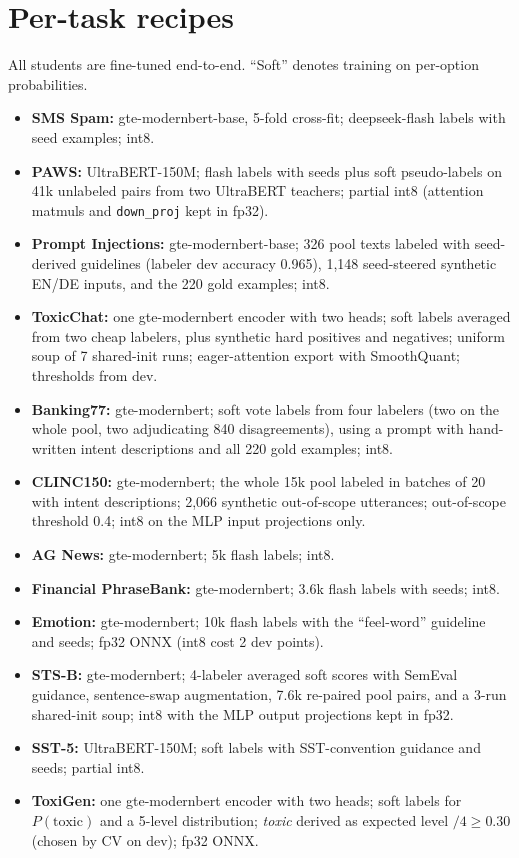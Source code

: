 \documentclass[11pt]{article}
\begin{document}
\section{Per-task recipes}\label{app:recipes}
All students are fine-tuned end-to-end. ``Soft'' denotes training on per-option probabilities.
\begin{itemize}
  \item \textbf{SMS Spam:} gte-modernbert-base, 5-fold cross-fit; deepseek-flash labels with seed examples; int8.
  \item \textbf{PAWS:} UltraBERT-150M; flash labels with seeds plus soft pseudo-labels on 41k unlabeled pairs from two UltraBERT teachers; partial int8 (attention matmuls and \texttt{down\_proj} kept in fp32).
  \item \textbf{Prompt Injections:} gte-modernbert-base; 326 pool texts labeled with seed-derived guidelines (labeler dev accuracy 0.965), 1,148 seed-steered synthetic EN/DE inputs, and the 220 gold examples; int8.
  \item \textbf{ToxicChat:} one gte-modernbert encoder with two heads; soft labels averaged from two cheap labelers, plus synthetic hard positives and negatives; uniform soup of 7 shared-init runs; eager-attention export with SmoothQuant; thresholds from dev.
  \item \textbf{Banking77:} gte-modernbert; soft vote labels from four labelers (two on the whole pool, two adjudicating 840 disagreements), using a prompt with hand-written intent descriptions and all 220 gold examples; int8.
  \item \textbf{CLINC150:} gte-modernbert; the whole 15k pool labeled in batches of 20 with intent descriptions; 2,066 synthetic out-of-scope utterances; out-of-scope threshold 0.4; int8 on the MLP input projections only.
  \item \textbf{AG News:} gte-modernbert; 5k flash labels; int8.
  \item \textbf{Financial PhraseBank:} gte-modernbert; 3.6k flash labels with seeds; int8.
  \item \textbf{Emotion:} gte-modernbert; 10k flash labels with the ``feel-word'' guideline and seeds; fp32 ONNX (int8 cost 2 dev points).
  \item \textbf{STS-B:} gte-modernbert; 4-labeler averaged soft scores with SemEval guidance, sentence-swap augmentation, 7.6k re-paired pool pairs, and a 3-run shared-init soup; int8 with the MLP output projections kept in fp32.
  \item \textbf{SST-5:} UltraBERT-150M; soft labels with SST-convention guidance and seeds; partial int8.
  \item \textbf{ToxiGen:} one gte-modernbert encoder with two heads; soft labels for $P(\text{toxic})$ and a 5-level distribution; \emph{toxic} derived as expected level $/4 \ge 0.30$ (chosen by CV on dev); fp32 ONNX.
\end{itemize}
\end{document}
